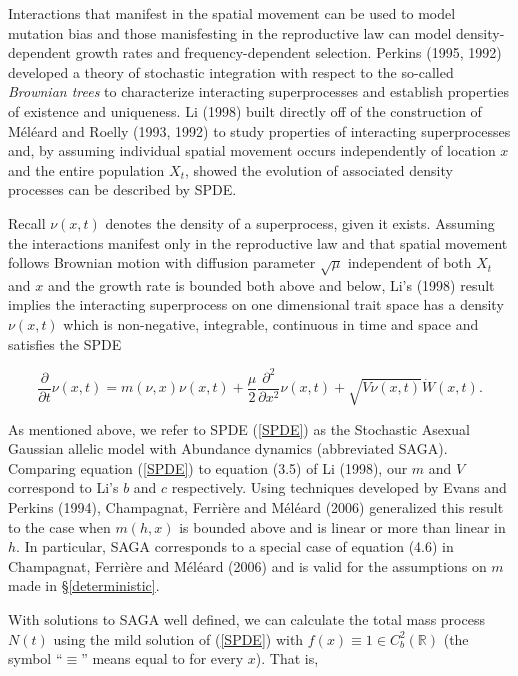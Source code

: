 \documentclass[]{elsarticle} %
\begin{document}
Interactions that manifest in the spatial movement can be used to model
mutation bias and those manisfesting in the reproductive law can model
density-dependent growth rates and frequency-dependent selection.
Perkins (1995, 1992) developed a theory of stochastic integration with
respect to the so-called \emph{Brownian trees} to characterize
interacting superprocesses and establish properties of existence and
uniqueness. Li (1998) built directly off of the construction of Méléard
and Roelly (1993, 1992) to study properties of interacting
superprocesses and, by assuming individual spatial movement occurs
independently of location \(x\) and the entire population \(X_t\),
showed the evolution of associated density processes can be described by
SPDE.

Recall \(\nu(x,t)\) denotes the density of a superprocess, given it
exists. Assuming the interactions manifest only in the reproductive law
and that spatial movement follows Brownian motion with diffusion
parameter \(\sqrt\mu\) independent of both \(X_t\) and \(x\) and the
growth rate is bounded both above and below, Li's (1998) result implies
the interacting superprocess on one dimensional trait space has a
density \(\nu(x,t)\) which is non-negative, integrable, continuous in
time and space and satisfies the SPDE

\begin{equation}\label{SPDE}
\frac{\partial}{\partial t}\nu(x,t)=m(\nu,x)\nu(x,t)+\frac{\mu}{2}\frac{\partial^2}{\partial x^2}\nu(x,t)+\sqrt{V\nu(x,t)}\dot W(x,t).
\end{equation}

As mentioned above, we refer to SPDE (\ref{SPDE}) as the Stochastic
Asexual Gaussian allelic model with Abundance dynamics (abbreviated
SAGA). Comparing equation (\ref{SPDE}) to equation (3.5) of Li (1998),
our \(m\) and \(V\) correspond to Li's \(b\) and \(c\) respectively.
Using techniques developed by Evans and Perkins (1994), Champagnat,
Ferrière and Méléard (2006) generalized this result to the case when
\(m(h,x)\) is bounded above and is linear or more than linear in \(h\).
In particular, SAGA corresponds to a special case of equation (4.6) in
Champagnat, Ferrière and Méléard (2006) and is valid for the assumptions
on \(m\) made in \S\ref{deterministic}.

With solutions to SAGA well defined, we can calculate the total mass
process \(N(t)\) using the mild solution of (\ref{SPDE}) with
\(f(x)\equiv1\in C_b^2(\mathbb{R})\) (the symbol ``\(\equiv\)'' means
equal to for every \(x\)). That is,
\end{document}
